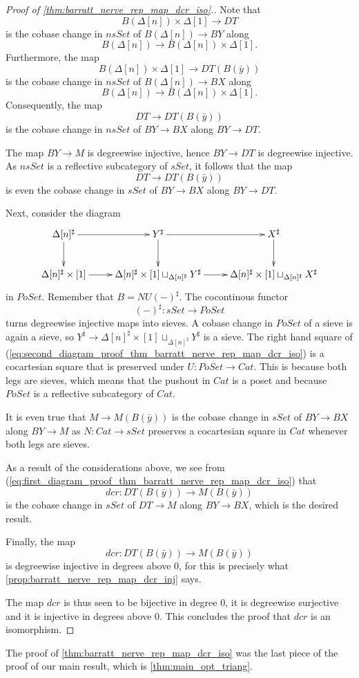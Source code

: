\begin{proof}[Proof of \cref{thm:barratt_nerve_rep_map_dcr_iso}.]
Note that
\[B(\Delta [n])\times \Delta [1]\to DT\]
is the cobase change in $nsSet$ of $B(\Delta [n])\to BY$ along
\[B(\Delta [n])\to B(\Delta [n])\times \Delta [1].\]
Furthermore, the map
\[B(\Delta [n])\times \Delta [1]\to DT(B(\bar{y} ))\]
is the cobase change in $nsSet$ of $B(\Delta [n])\to BX$ along
\[B(\Delta [n])\to B(\Delta [n])\times \Delta [1].\]
Consequently, the map
\[DT\to DT(B(\bar{y} ))\]
is the cobase change in $nsSet$ of $BY\to BX$ along $BY\to DT$.

The map $BY\to M$ is degreewise injective, hence $BY\to DT$ is degreewise injective. As $nsSet$ is a reflective subcategory of $sSet$, it follows that the map
\[DT\to DT(B(\bar{y} ))\]
is even the cobase change in $sSet$ of $BY\to BX$ along $BY\to DT$.

Next, consider the diagram
\begin{equation}
\label{eq:second_diagram_proof_thm_barratt_nerve_rep_map_dcr_iso}
\begin{gathered}
\xymatrix{
\Delta [n]^\sharp \ar[d] \ar[r] & Y^\sharp \ar[d] \ar[r] & X^\sharp \ar[d] \\
\Delta [n]^\sharp \times [1] \ar[r] & \Delta [n]^\sharp \times [1]\sqcup _{\Delta [n]^\sharp }Y^\sharp \ar[r] & \Delta [n]^\sharp \times [1]\sqcup _{\Delta [n]^\sharp }X^\sharp
}
\end{gathered}
\end{equation}
in $PoSet$. Remember that $B=NU(-)^\sharp$. The cocontinous functor
\[(-)^\sharp :sSet\to PoSet\]
turns degreewise injective maps into sieves. A cobase change in $PoSet$ of a sieve is again a sieve, so $Y^\sharp \to \Delta [n]^\sharp \times [1]\sqcup _{\Delta [n]^\sharp }Y^\sharp$ is a sieve. The right hand square of (\ref{eq:second_diagram_proof_thm_barratt_nerve_rep_map_dcr_iso}) is a cocartesian square that is preserved under $U:PoSet\to Cat$. This is because both legs are sieves, which means that the pushout in $Cat$ is a poset and because $PoSet$ is a reflective subcategory of $Cat$.

It is even true that $M\to M(B(\bar{y} ))$ is the cobase change in $sSet$ of $BY\to BX$ along $BY\to M$ as $N:Cat\to sSet$ preserves a cocartesian square in $Cat$ whenever both legs are sieves.

As a result of the considerations above, we see from (\ref{eq:first_diagram_proof_thm_barratt_nerve_rep_map_dcr_iso}) that
\[dcr:DT(B(\bar{y} ))\to M(B(\bar{y} ))\]
is the cobase change in $sSet$ of $DT\to M$ along $BY\to BX$, which is the desired result.

Finally, the map
\[dcr:DT(B(\bar{y} ))\to M(B(\bar{y} ))\]
is degreewise injective in degrees above $0$, for this is precisely what \cref{prop:barratt_nerve_rep_map_dcr_inj} says.

The map $dcr$ is thus seen to be bijective in degree $0$, it is degreewise surjective and it is injective in degrees above $0$. This concludes the proof that $dcr$ is an isomorphism.
\end{proof}
\noindent The proof of \cref{thm:barratt_nerve_rep_map_dcr_iso} was the last piece of the proof of our main result, which is \cref{thm:main_opt_triang}.






